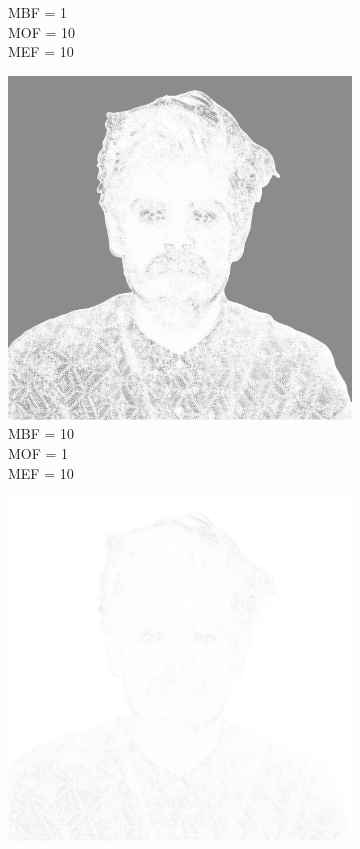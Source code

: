 \begin{figure}[htb]
\begin{subfigure}{0.32\textwidth}
        \caption{MBF = 1 \\ MOF = 10 \\ MEF = 10}
        \label{mine-param-taco-g}
    \end{subfigure}
    \begin{subfigure}{0.32\textwidth}
        \centering
        \includegraphics[width = \textwidth]{img/4-mine/taco-mask/taco_mask_c20_inv0_bg10_obj1_ed10.png}
        \caption{MBF = 10 \\ MOF = 1 \\ MEF = 10}
        \label{mine-param-taco-h}
    \end{subfigure}
    \begin{subfigure}{0.32\textwidth}
        \centering
        \includegraphics[width = \textwidth]{img/4-mine/taco-mask/taco_mask_c20_inv0_bg10_obj10_ed1.png}

\end{subfigure}
\end{figure}

